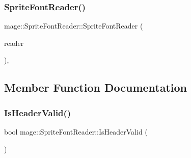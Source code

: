 \hypertarget{classmage_1_1_sprite_font_reader_a2130816e03384c99af146a21795ac5e8}{}\label{classmage_1_1_sprite_font_reader_a2130816e03384c99af146a21795ac5e8} 
\subsubsection{\texorpdfstring{Sprite\+Font\+Reader()}{SpriteFontReader()}\hspace{0.1cm}{\footnotesize\ttfamily [3/3]}}
{\footnotesize\ttfamily mage\+::\+Sprite\+Font\+Reader\+::\+Sprite\+Font\+Reader (\begin{DoxyParamCaption}\item[{\hyperlink{classmage_1_1_sprite_font_reader}{Sprite\+Font\+Reader} \&\&}]{reader }\end{DoxyParamCaption})\hspace{0.3cm}{\ttfamily [private]}, {\ttfamily [delete]}}



\subsection{Member Function Documentation}
\hypertarget{classmage_1_1_sprite_font_reader_aa6dd3fc28e531d6db6ecda6ce3535d4c}{}\label{classmage_1_1_sprite_font_reader_aa6dd3fc28e531d6db6ecda6ce3535d4c} 
\subsubsection{\texorpdfstring{Is\+Header\+Valid()}{IsHeaderValid()}}
{\footnotesize\ttfamily bool mage\+::\+Sprite\+Font\+Reader\+::\+Is\+Header\+Valid (\begin{DoxyParamCaption}{ }\end{DoxyParamCaption})\hspace{0.3cm}{\ttfamily [protected]}}

\hypertarget{classmage_1_1_sprite_font_reader_a4de55b4bebfabb5f1c32078864baef11}{}\label{classmage_1_1_sprite_font_reader_a4de55b4bebfabb5f1c32078864baef11} 
